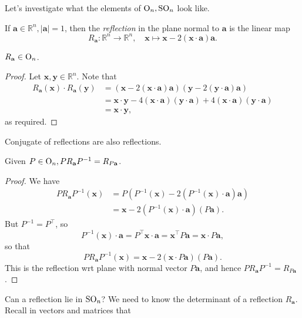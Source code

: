 \documentclass[a4paper]{article}
\begin{document}
Let's investigate what the elements of $ \mathrm{O}_n, \mathrm{SO}_n $ look like.
\begin{definition}
  If $ \mathbf{a}\in \mathbb{R}^{n}, |\mathbf{a}|=1 $, then the
  \textit{reflection} in the plane normal to $\mathbf{a}$ is the linear map
  \[
    R_{\mathbf{a}}:\mathbb{R}^{n}\to \mathbb{R}^{n},\quad \mathbf{x}
    \mapsto \mathbf{x}-2(\mathbf{x} \cdot \mathbf{a})\mathbf{a}.
  \]
\end{definition}
\begin{proposition}\label{prop:7.15}
  $ R_\mathbf{a}\in \mathrm{O}_n $.
\end{proposition}
\begin{proof}
  Let $ \mathbf{x},\mathbf{y}\in \mathbb{R}^{n} $. Note that
  \begin{align*}
    R_\mathbf{a}(\mathbf{x})\cdot R_\mathbf{a}(\mathbf{y}) &=
    (\mathbf{x}-2(\mathbf{x} \cdot
    \mathbf{a})\mathbf{a})(\mathbf{y}-2(\mathbf{y} \cdot
    \mathbf{a})\mathbf{a})\\
    &= \mathbf{x} \cdot \mathbf{y} - 4(\mathbf{x} \cdot
    \mathbf{a})(\mathbf{y} \cdot \mathbf{a})+4(\mathbf{x} \cdot
    \mathbf{a})(\mathbf{y} \cdot \mathbf{a})\\
    &=\mathbf{x} \cdot \mathbf{y},
  \end{align*}
  as required.
\end{proof}
Conjugate of reflections are also reflections.
\begin{lemma}\label{lma:7.16}
  Given $ P\in \mathrm{O}_n, PR_\mathbf{a} P^{-1} = R_{P\mathbf{a}} $.
\end{lemma}
\begin{proof}
  We have
  \begin{align*}
    PR_\mathbf{a} P^{-1}(\mathbf{x}) &=
    P(P^{-1}(\mathbf{x})-2(P^{-1}(\mathbf{x}) \cdot \mathbf{a})\mathbf{a})\\
    &=\mathbf{x}-2(P^{-1}(\mathbf{x}) \cdot \mathbf{a})(P\mathbf{a}).
  \end{align*}
  But $ P^{-1}=P^\top $, so
  \[
    P^{-1}(\mathbf{x}) \cdot \mathbf{a} = P^\top \mathbf{x} \cdot
    \mathbf{a} = \mathbf{x}^\top P \mathbf{a} = \mathbf{x} \cdot P\mathbf{a},
  \]
  so that
  \[
    PR_\mathbf{a} P^{-1}(\mathbf{x}) = \mathbf{x}-2(\mathbf{x} \cdot
    P\mathbf{a})(P\mathbf{a}).
  \]
  This is the reflection wrt plane with normal vector $ P\mathbf{a}
  $, and hence $ PR_\mathbf{a} P^{-1} = R_{P\mathbf{a}} $.
\end{proof}
Can a reflection lie in $ \mathrm{SO}_n $? We need to know the determinant of
a reflection $ R_\mathbf{a} $. Recall in vectors and matrices that
\end{document}
